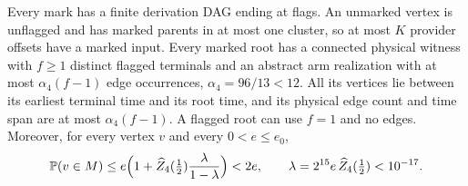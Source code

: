 \begin{lemma}\label{ld:contours}
Every mark has a finite derivation DAG ending at flags. An unmarked vertex is unflagged and has
marked parents in at most one cluster, so at most $K$ provider offsets have a marked input. Every
marked root has a connected physical witness with $f\ge1$ distinct flagged terminals and an abstract
arm realization with at most $\alpha_4(f-1)$ edge occurrences, $\alpha_4=96/13<12$. All its vertices
lie between its earliest terminal time and its root time, and its physical edge count and time span
are at most $\alpha_4(f-1)$. A flagged root can use $f=1$ and no edges. Moreover, for every vertex $v$
and every $0<e\le e_0$,
\begin{equation}\label{ld:sparse}
  \mathbb{P}(v\in M)\le e\Bigl(1+\widehat Z_4(\tfrac12)\frac{\lambda}{1-\lambda}\Bigr)<2e,
  \qquad \lambda=2^{15}e\,\widehat Z_4(\tfrac12)<10^{-17}.
\end{equation}
\end{lemma}
